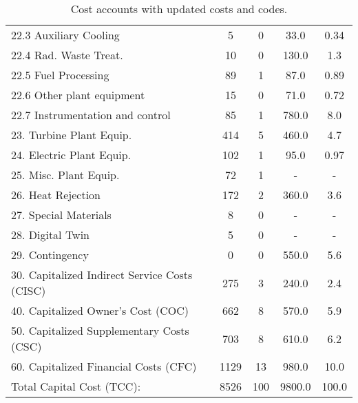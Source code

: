 \begin{table}[h!]
{\begin{tabular}{lcccc}
\hspace{10mm}22.3 Auxiliary Cooling & 5 & 0 & 33.0 & 0.34 \\
\hspace{10mm}22.4 Rad. Waste Treat. & 10 & 0 & 130.0 & 1.3 \\
\hspace{10mm}22.5 Fuel Processing & 89 & 1 & 87.0 & 0.89 \\
\hspace{10mm}22.6 Other plant equipment & 15 & 0 & 71.0 & 0.72 \\
\hspace{10mm}22.7 Instrumentation and control & 85 & 1 & 780.0 & 8.0 \\
\hspace{5mm}23. Turbine Plant Equip. & 414 & 5 & 460.0 & 4.7 \\
\hspace{5mm}24. Electric Plant Equip. & 102 & 1 & 95.0 & 0.97 \\
\hspace{5mm}25. Misc. Plant Equip. & 72 & 1 & - & - \\
\hspace{5mm}26. Heat Rejection & 172 & 2 & 360.0 & 3.6 \\
\hspace{5mm}27. Special Materials & 8 & 0 & - & - \\
\hspace{5mm}28. Digital Twin & 5 & 0 & - & - \\
\hspace{5mm}29. Contingency & 0 & 0 & 550.0 & 5.6 \\
30. Capitalized Indirect Service Costs (CISC) & 275 & 3 & 240.0 & 2.4 \\
40. Capitalized Owner’s Cost (COC) & 662 & 8 & 570.0 & 5.9 \\
50. Capitalized Supplementary Costs (CSC) & 703 & 8 & 610.0 & 6.2 \\
60. Capitalized Financial Costs (CFC) & 1129 & 13 & 980.0 & 10.0 \\
\hline
Total Capital Cost (TCC): & 8526 & 100 & 9800.0 & 100.0 \\
\hline
\end{tabular}
}
\caption{Cost accounts with updated costs and codes. }
\label{tab:costsupdatedcodes}
\end{table}


